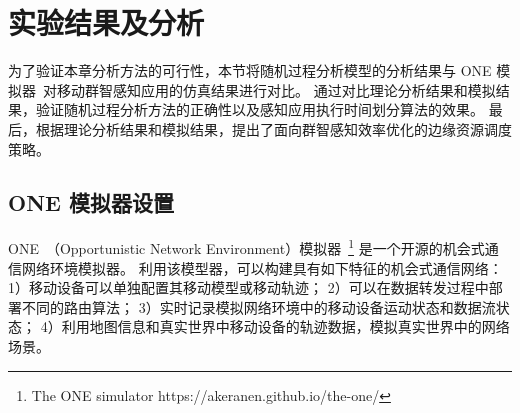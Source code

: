 \section{实验结果及分析}

为了验证本章分析方法的可行性，本节将随机过程分析模型的分析结果与 ONE 模拟器~\cite{DBLP:conf/simutools/OK09}对移动群智感知应用的仿真结果进行对比。
通过对比理论分析结果和模拟结果，验证随机过程分析方法的正确性以及感知应用执行时间划分算法的效果。
最后，根据理论分析结果和模拟结果，提出了面向群智感知效率优化的边缘资源调度策略。

\subsection{ONE 模拟器设置}
ONE~（Opportunistic Network Environment）模拟器~\footnote{The ONE simulator https://akeranen.github.io/the-one/} 是一个开源的机会式通信网络环境模拟器。
利用该模型器，可以构建具有如下特征的机会式通信网络：
1）移动设备可以单独配置其移动模型或移动轨迹；
2）可以在数据转发过程中部署不同的路由算法；
3）实时记录模拟网络环境中的移动设备运动状态和数据流状态；
4）利用地图信息和真实世界中移动设备的轨迹数据，模拟真实世界中的网络场景。

